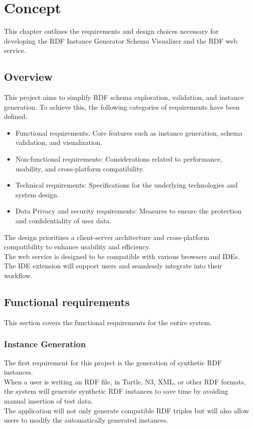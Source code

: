 \chapter{Concept\label{cha:chapter3}}
This chapter outlines the requirements and design choices necessary for developing the RDF Instance Generator Schema Visualizer and the RDF web service.

\section{Overview\label{sec:reqoverview}}

This project aims to simplify RDF schema exploration, validation, and instance generation. To achieve this, the following categories of requirements have been defined:
\begin{itemize}
    \item Functional requirements: Core features such as instance generation, schema validation, and visualization.
    \item Non-functional requirements: Considerations related to performance, usability, and cross-platform compatibility.
    \item Technical requirements: Specifications for the underlying technologies and system design.
    \item Data Privacy and security requirements: Measures to ensure the protection and confidentiality of user data.
\end{itemize}

The design prioritizes a client-server architecture and cross-platform compatibility to enhance usability and efficiency. 
\\
The web service is designed to be compatible with various browsers and IDEs. 
\\
The IDE extension will support users and seamlessly integrate into their workflow.

\section{Functional requirements\label{sec:techreq}}
This section covers the functional requirements for the entire system.

\subsection{Instance Generation\label{sec:reqsuba}}
The first requirement for this project is the generation of synthetic RDF instances.
\\
When a user is writing an RDF file, in Turtle, N3, XML, or other RDF formats, the system will generate synthetic RDF instances to save time by avoiding manual insertion of test data.
\\
The application will not only generate compatible RDF triples but will also allow users to modify the automatically generated instances.

